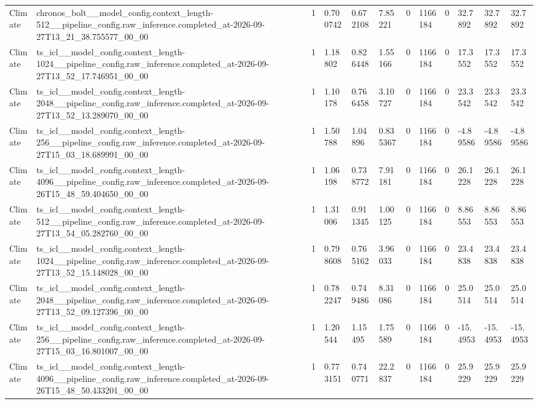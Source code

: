 \begin{tabular}{llllllllllll}
Climate & chronos\_bolt\_\_model\_config.context\_length-512\_\_pipeline\_config.raw\_inference.completed\_at-2026-09-27T13\_21\_38.755577\_00\_00 & 1 & 0.700742 & 0.672108 & 7.85221 & 0 & 1166184 & 0 & 32.7892 & 32.7892 & 32.7892 \\
Climate & ts\_icl\_\_model\_config.context\_length-1024\_\_pipeline\_config.raw\_inference.completed\_at-2026-09-27T13\_52\_17.746951\_00\_00 & 1 & 1.18802 & 0.826448 & 1.55166 & 0 & 1166184 & 0 & 17.3552 & 17.3552 & 17.3552 \\
Climate & ts\_icl\_\_model\_config.context\_length-2048\_\_pipeline\_config.raw\_inference.completed\_at-2026-09-27T13\_52\_13.289070\_00\_00 & 1 & 1.10178 & 0.766458 & 3.10727 & 0 & 1166184 & 0 & 23.3542 & 23.3542 & 23.3542 \\
Climate & ts\_icl\_\_model\_config.context\_length-256\_\_pipeline\_config.raw\_inference.completed\_at-2026-09-27T15\_03\_18.689991\_00\_00 & 1 & 1.50788 & 1.04896 & 0.835367 & 0 & 1166184 & 0 & -4.89586 & -4.89586 & -4.89586 \\
Climate & ts\_icl\_\_model\_config.context\_length-4096\_\_pipeline\_config.raw\_inference.completed\_at-2026-09-26T15\_48\_59.404650\_00\_00 & 1 & 1.06198 & 0.738772 & 7.91181 & 0 & 1166184 & 0 & 26.1228 & 26.1228 & 26.1228 \\
Climate & ts\_icl\_\_model\_config.context\_length-512\_\_pipeline\_config.raw\_inference.completed\_at-2026-09-27T13\_54\_05.282760\_00\_00 & 1 & 1.31006 & 0.911345 & 1.00125 & 0 & 1166184 & 0 & 8.86553 & 8.86553 & 8.86553 \\
Climate & ts\_icl\_\_model\_config.context\_length-1024\_\_pipeline\_config.raw\_inference.completed\_at-2026-09-27T13\_52\_15.148028\_00\_00 & 1 & 0.798608 & 0.765162 & 3.96033 & 0 & 1166184 & 0 & 23.4838 & 23.4838 & 23.4838 \\
Climate & ts\_icl\_\_model\_config.context\_length-2048\_\_pipeline\_config.raw\_inference.completed\_at-2026-09-27T13\_52\_09.127396\_00\_00 & 1 & 0.782247 & 0.749486 & 8.31086 & 0 & 1166184 & 0 & 25.0514 & 25.0514 & 25.0514 \\
Climate & ts\_icl\_\_model\_config.context\_length-256\_\_pipeline\_config.raw\_inference.completed\_at-2026-09-27T15\_03\_16.801007\_00\_00 & 1 & 1.20544 & 1.15495 & 1.75589 & 0 & 1166184 & 0 & -15.4953 & -15.4953 & -15.4953 \\
Climate & ts\_icl\_\_model\_config.context\_length-4096\_\_pipeline\_config.raw\_inference.completed\_at-2026-09-26T15\_48\_50.433201\_00\_00 & 1 & 0.773151 & 0.740771 & 22.2837 & 0 & 1166184 & 0 & 25.9229 & 25.9229 & 25.9229 \\

\end{tabular}
